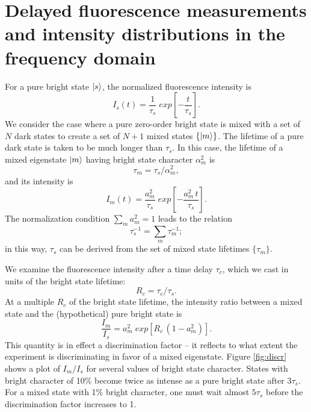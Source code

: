 \documentclass[12pt]{article}
\begin{document}
\section*{Delayed fluorescence measurements and intensity
  distributions in the frequency domain}

For a pure bright state $\mathinner{|{s}\rangle}$, the normalized fluorescence
intensity is
\begin{equation}
  I_s(t) = \frac{1}{\tau_s} \;
           exp\left[
             -\frac{t}{ \tau_s} 
           \right].
\end{equation}
We consider the case where a pure zero-order bright state is mixed
with a set of $N$ dark states to create a set of $N+1$ mixed states
$\lbrace\mathinner{|{m}\rangle}\rbrace$.  The lifetime of a pure dark state is taken
to be much longer than $\tau_s$.  In this case, the lifetime of a
mixed eigenstate $\mathinner{|{m}\rangle}$ having bright state character $\alpha_m^2$
is
\begin{equation}
  \label{eq:tau-m}
  \tau_m = \tau_s / \alpha_m^2,
\end{equation}
and its intensity is
\begin{equation}
  I_m(t) = \frac{a_m^2}{\tau_s} \;
           exp\left[
             -\frac{a_m^2 \, t}{\tau_s} 
           \right].
\end{equation}
The normalization condition $\sum_m a_m^2 = 1$ leads to the relation
\begin{equation}
  \tau_s^{-1} = \sum_m \tau_m^{-1};
\end{equation}
in this way, $\tau_s$ can be derived from the set of mixed state
lifetimes $\lbrace \tau_m \rbrace$.

We examine the fluorescence intensity after a time delay $\tau_c$,
which we cast in units of the bright state lifetime:
\begin{equation}
  R_c = \tau_c / \tau_s.
\end{equation}
At a multiple $R_c$ of the bright state lifetime, the intensity ratio
between a mixed state and the (hypothetical) pure bright state is
\begin{equation}
  \frac{I_m}{I_s} = a_m^2 \; 
                   exp\left[
                     R_c \, (1 - a_m^2)
                   \right].
\end{equation}
This quantity is in effect a discrimination factor -- it reflects to
what extent the experiment is discriminating in favor of a mixed
eigenstate.  Figure \ref{fig:discr} shows a plot of $I_m/I_s$ for
several values of bright state character.  States with bright
character of 10\% become twice as intense as a pure bright state after
$3\tau_s$.  For a mixed state with 1\% bright character, one must wait
almost $5\tau_s$ before the discrimination factor increases to 1.
\end{document}
